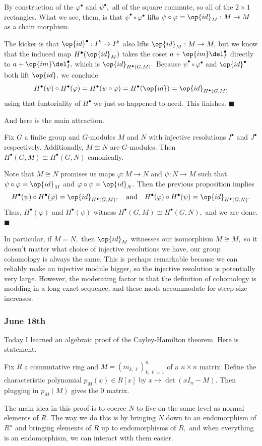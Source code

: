 By construction of the $\varphi^\bullet$ and $\psi^\bullet,$ all of the square commute, so all of the $2\times1$ rectangles. What we see, them, is that $\psi^\bullet\circ\varphi^\bullet$ lifts $\psi\circ\varphi=\op{id}_M:M\to M$ as a chain morphism.

The kicker is that $\op{id}^\bullet:I^k\to I^k$ also lifts $\op{id}_M:M\to M,$ but we know that the induced map $H^\bullet(\op{id}_M)$ takes the coset $a+\op{im}\del_I^\bullet$ directly to $a+\op{im}\del_I^\bullet,$ which is $\op{id}_{H^\bullet(G,M)}.$ Because $\psi^\bullet\circ\varphi^\bullet$ and $\op{id}^\bullet$ both lift $\op{id},$ we conclude
\[H^\bullet(\psi)\circ H^\bullet(\varphi)=H^\bullet(\psi\circ\varphi)=H^\bullet(\op{id})=\op{id}_{H^\bullet(G,M)}\]
using that funtoriality of $H^\bullet$ we just so happened to need. This finishes. $\blacksquare$

And here is the main attraction.
\begin{theorem}
    Fix $G$ a finite group and $G$-modules $M$ and $N$ with injective resolutions $I^\bullet$ and $J^\bullet$ respectively. Additionally, $M\cong N$ are $G$-modules. Then $H^\bullet(G,M)\cong H^\bullet(G,N)$ canonically.
\end{theorem}
Note that $M\cong N$ promises us maps $\varphi:M\to N$ and $\psi:N\to M$ such that $\psi\circ\varphi=\op{id}_M$ and $\varphi\circ\psi=\op{id}_N.$ Then the previous proposition implies
\[H^\bullet(\psi)\circ H^\bullet(\varphi)=\op{id}_{H^\bullet(G,M)},\quad\text{and}\quad H^\bullet(\varphi)\circ H^\bullet(\psi)=\op{id}_{H^\bullet(G,N)}.\]
Thus, $H^\bullet(\varphi)$ and $H^\bullet(\psi)$ witness $H^\bullet(G,M)\cong H^\bullet(G,N),$ and we are done. $\blacksquare$

In particular, if $M=N,$ then $\op{id}_M$ witnesses our isomorphism $M\cong M,$ so it doesn't matter what choice of injective resolutions we have, our group cohomology is always the same. This is perhaps remarkable because we can reliably make an injective module bigger, so the injective resolution is potentially very large. However, the moderating factor is that the definition of cohomology is modding in a long exact sequence, and these mods accommodate for steep size increases.

\subsubsection{June 18th}
Today I learned an algebraic proof of the Cayley-Hamilton theorem. Here is statement.
\begin{theorem}
    Fix $R$ a commutative ring and $M=(m_{k,\ell})_{k,\ell=1}^n$ of a $n\times n$ matrix. Define the characteristic polynomial $p_M(x)\in R[x]$ by $x\mapsto\det(xI_n-M).$ Then plugging in $p_M(M)$ gives the $0$ matrix.
\end{theorem}
The main idea in this proof is to coerce $N$ to live on the same level as normal elements of $R.$ The way we do this is by bringing $N$ down to an endomorphism of $R^n$ and bringing elements of $R$ up to endomorphisms of $R,$ and when everything is an endomorphism, we can interact with them easier.

